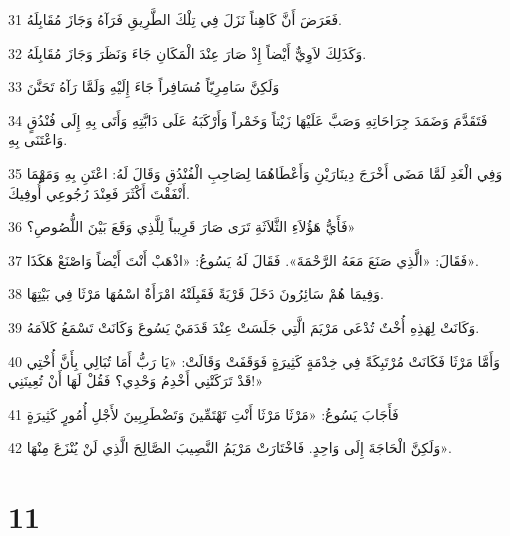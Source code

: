 \par 31 فَعَرَضَ أَنَّ كَاهِناً نَزَلَ فِي تِلْكَ الطَّرِيقِ فَرَآهُ وَجَازَ مُقَابِلَهُ.
\par 32 وَكَذَلِكَ لاَوِيٌّ أَيْضاً إِذْ صَارَ عِنْدَ الْمَكَانِ جَاءَ وَنَظَرَ وَجَازَ مُقَابِلَهُ.
\par 33 وَلَكِنَّ سَامِرِيّاً مُسَافِراً جَاءَ إِلَيْهِ وَلَمَّا رَآهُ تَحَنَّنَ
\par 34 فَتَقَدَّمَ وَضَمَدَ جِرَاحَاتِهِ وَصَبَّ عَلَيْهَا زَيْتاً وَخَمْراً وَأَرْكَبَهُ عَلَى دَابَّتِهِ وَأَتَى بِهِ إِلَى فُنْدُقٍ وَاعْتَنَى بِهِ.
\par 35 وَفِي الْغَدِ لَمَّا مَضَى أَخْرَجَ دِينَارَيْنِ وَأَعْطَاهُمَا لِصَاحِبِ الْفُنْدُقِ وَقَالَ لَهُ: اعْتَنِ بِهِ وَمَهْمَا أَنْفَقْتَ أَكْثَرَ فَعِنْدَ رُجُوعِي أُوفِيكَ.
\par 36 فَأَيُّ هَؤُلاَءِ الثَّلاَثَةِ تَرَى صَارَ قَرِيباً لِلَّذِي وَقَعَ بَيْنَ اللُّصُوصِ؟»
\par 37 فَقَالَ: «الَّذِي صَنَعَ مَعَهُ الرَّحْمَةَ». فَقَالَ لَهُ يَسُوعُ: «اذْهَبْ أَنْتَ أَيْضاً وَاصْنَعْ هَكَذَا».
\par 38 وَفِيمَا هُمْ سَائِرُونَ دَخَلَ قَرْيَةً فَقَبِلَتْهُ امْرَأَةٌ اسْمُهَا مَرْثَا فِي بَيْتِهَا.
\par 39 وَكَانَتْ لِهَذِهِ أُخْتٌ تُدْعَى مَرْيَمَ الَّتِي جَلَسَتْ عِنْدَ قَدَمَيْ يَسُوعَ وَكَانَتْ تَسْمَعُ كَلاَمَهُ.
\par 40 وَأَمَّا مَرْثَا فَكَانَتْ مُرْتَبِكَةً فِي خِدْمَةٍ كَثِيرَةٍ فَوَقَفَتْ وَقَالَتْ: «يَا رَبُّ أَمَا تُبَالِي بِأَنَّ أُخْتِي قَدْ تَرَكَتْنِي أَخْدِمُ وَحْدِي؟ فَقُلْ لَهَا أَنْ تُعِينَنِي!»
\par 41 فَأَجَابَ يَسُوعُ: «مَرْثَا مَرْثَا أَنْتِ تَهْتَمِّينَ وَتَضْطَرِبِينَ لأَجْلِ أُمُورٍ كَثِيرَةٍ
\par 42 وَلَكِنَّ الْحَاجَةَ إِلَى وَاحِدٍ. فَاخْتَارَتْ مَرْيَمُ النَّصِيبَ الصَّالِحَ الَّذِي لَنْ يُنْزَعَ مِنْهَا».

\chapter{11}


